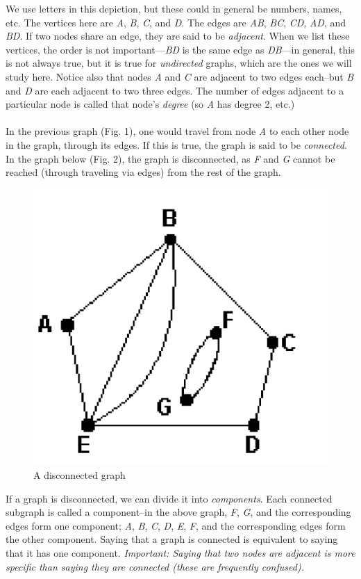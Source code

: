 \documentclass[12pt]{article}
\begin{document}
We use letters in this depiction, but these could in general be numbers, names, etc. The vertices here are \emph{A}, \emph{B}, \emph{C}, and \emph{D}. The edges are \emph{AB}, \emph{BC}, \emph{CD}, \emph{AD}, and \emph{BD}. If two nodes share an edge, they are said to be \emph{adjacent}. When we list these vertices, the order is not important---\emph{BD} is the same edge as \emph{DB}---in general, this is not always true, but it is true for \emph{undirected} graphs, which are the ones we will study here. Notice also that nodes \emph{A} and \emph{C} are adjacent to two edges each--but \emph{B} and \emph{D} are each adjacent to two three edges. The number of edges adjacent to a particular node is called that node's \emph{degree} (so \emph{A} has degree 2, etc.)
\\
\\
In the previous graph (Fig. 1), one would travel from node \emph{A} to each other node in the graph, through its edges. If this is true, the graph is said to be \emph{connected}. In the graph below (Fig. 2), the graph is disconnected, as \emph{F} and \emph{G} cannot be reached (through traveling via edges) from the rest of the graph.

\begin{figure}[htbp]
\begin{center}
\includegraphics[width=.25\linewidth]{disconnected.png}
\caption{A disconnected graph}
\label{default}
\end{center}
\end{figure}

If a graph is disconnected, we can divide it into \emph{components}. Each connected subgraph is called a component--in the above graph, \emph{F}, \emph{G}, and the corresponding edges form one component; \emph{A}, \emph{B}, \emph{C}, \emph{D}, \emph{E}, \emph{F}, and the corresponding edges form the other component. Saying that a graph is connected is equivalent to saying that it has one component. \emph{Important: Saying that two nodes are adjacent is more specific than saying they are connected (these are frequently confused).}
\end{document}
